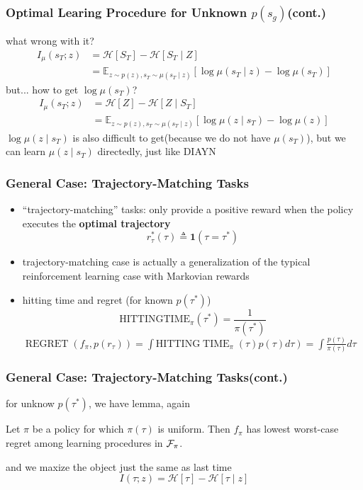 \documentclass[aspectratio=169]{beamer}
\begin{document}
\begin{frame}
  \frametitle{Optimal Learing Procedure for Unknown $p(s_g)$(cont.)}
  what wrong with it?
  \begin{equation*}
    \begin{aligned}
      I_\mu(s_T;z)&=\mathcal{H}[S_T] - \mathcal{H}[S_T\mid Z]\\
      &=\mathbb{E}_{z \sim p(z), s_T \sim \mu(s_T\mid z)}[\log \mu(s_T \mid z) - \log \mu(s_T)]
    \end{aligned}
  \end{equation*}
  but... how to get $\log \mu(s_T)$?
  \begin{equation*}
    \begin{aligned}
      I_\mu(s_T;z)&=\mathcal{H}[Z] - \mathcal{H}[Z\mid S_T]\\
      &=\mathbb{E}_{z \sim p(z), s_T \sim \mu(s_T\mid z)}[\log \mu(z\mid s_T) - \log \mu(z)]
    \end{aligned}
  \end{equation*}
  $\log \mu(z\mid s_T)$ is also difficult to get(because we do not have $\mu(s_T)$), but we can learn $\mu(z\mid s_T)$ directedly, just like DIAYN
\end{frame}

\begin{frame}
  \frametitle{General Case: Trajectory-Matching Tasks}
  \begin{itemize}
    \item “trajectory-matching” tasks: only provide a positive reward when the policy executes the \textbf{optimal trajectory}\\$$r_{\tau}^{*}(\tau) \triangleq \mathbf{1}\left(\tau=\tau^{*}\right)$$
    \item trajectory-matching case is actually a generalization of the typical reinforcement learning case with Markovian rewards
    \item hitting time and regret (for known $p(\tau^*)$)\\
    $$\mathrm{HITTINGTIME}_{\pi}\left(\tau^{*}\right)=\frac{1}{\pi\left(\tau^{*}\right)}$$
    $\operatorname{REGRET}\left(f_{\pi}, p\left(r_{\tau}\right)\right)=\int \left.\mathrm{HITTING} \operatorname{TIME}_{\pi}(\tau) p(\tau) d \tau\right)=\int \frac{p(\tau)}{\pi(\tau)} d \tau$
  \end{itemize}
\end{frame}

\begin{frame}
  \frametitle{General Case: Trajectory-Matching Tasks(cont.)}
  for unknow $p(\tau^*)$, we have lemma, again
  \begin{lemma}
    Let $\pi$ be a policy for which $\pi(\tau)$ is uniform. Then $f_\pi$ has lowest worst-case regret among learning procedures in ${\mathcal{F}}_\pi$.
    \end{lemma}
    and we maxize the object just the same as last time$$I(\tau ; z)=\mathcal{H}[\tau]-\mathcal{H}[\tau \mid z]$$
\end{frame}
\end{document}

